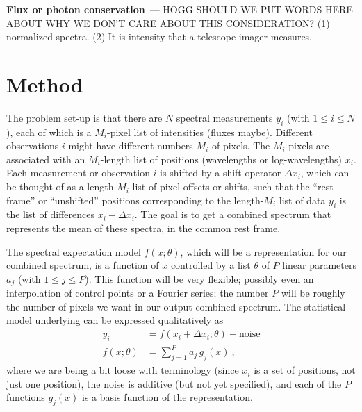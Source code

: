 \documentclass[modern]{aastex631}
\renewcommand{\paragraph}[1]{\medskip\par\noindent\textbf{#1}~---}
\begin{document}
\paragraph{Flux or photon conservation}
HOGG SHOULD WE PUT WORDS HERE ABOUT WHY WE DON'T CARE ABOUT THIS CONSIDERATION? (1) normalized spectra. (2) It is intensity that a telescope imager measures.

\section{Method}\label{sec:method}

The problem set-up is that there are $N$ spectral measurements $y_i$ (with $1\leq i\leq N$), each of which is a $M_i$-pixel list of intensities (fluxes maybe).
Different observations $i$ might have different numbers $M_i$ of pixels.
The $M_i$ pixels are associated with an $M_i$-length list of positions (wavelengths or log-wavelengths) $x_i$.
Each measurement or observation $i$ is shifted by a shift operator $\Delta x_i$, which can be thought of as a length-$M_i$ list of pixel offsets or shifts, such that the ``rest frame'' or ``unshifted'' positions corresponding to the length-$M_i$ list of data $y_i$ is the list of differences $x_i - \Delta x_i$.
The goal is to get a combined spectrum that represents the mean of these spectra, in the common rest frame.

The spectral expectation model $f(x;\theta)$, which will be a representation for our combined spectrum, is a function of $x$ controlled by a list $\theta$ of $P$ linear parameters $a_j$ (with $1\leq j\leq P$).
This function will be very flexible; possibly even an interpolation of control points or a Fourier series; the number $P$ will be roughly the number of pixels we want in our output combined spectrum.
The statistical model underlying can be expressed qualitatively as
\begin{align}
    y_i &= f(x_i + \Delta x_i;\theta) + \mbox{noise} \\
    f(x;\theta) &= \sum_{j=1}^P a_j\,g_j(x) ~,
\end{align}
where we are being a bit loose with terminology (since $x_i$ is a set of positions, not just one position), the noise is additive (but not yet specified), and each of the $P$ functions $g_j(x)$ is a basis function of the representation.
\end{document}
